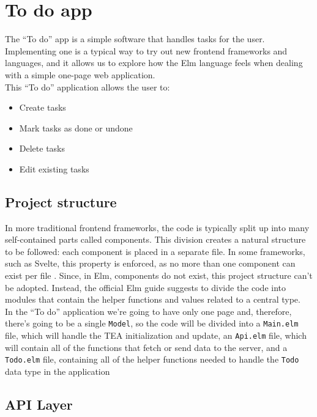 \section{To do app}

The ``To do'' app is a simple software that handles tasks for the user. Implementing one is a typical way to try out new frontend frameworks and languages, and it allows us to explore how the Elm language feels when dealing with a simple one-page web application. \\
This ``To do'' application allows the user to:
\begin{itemize}
    \item Create tasks
    \item Mark tasks as done or undone
    \item Delete tasks
    \item Edit existing tasks
\end{itemize}

\subsection{Project structure}

In more traditional frontend frameworks, the code is typically split up into many self-contained parts called components. This division creates a natural structure to be followed: each component is placed in a separate file. In some frameworks, such as Svelte, this property is enforced, as no more than one component can exist per file \cite{noauthor_svelte_nodate}. Since, in Elm, components do not exist, this project structure can't be adopted. Instead, the official Elm guide suggests to divide the code into modules that contain the helper functions and values related to a central type. \cite{noauthor_structure_nodate}\\

In the ``To do'' application we're going to have only one page and, therefore, there's going to be a single \texttt{Model}, so the code will be divided into a \texttt{Main.elm} file, which will handle the TEA initialization and update, an \texttt{Api.elm} file, which will contain all of the functions that fetch or send data to the server, and a \texttt{Todo.elm} file, containing all of the helper functions needed to handle the \texttt{Todo} data type in the application

\subsection{API Layer}

